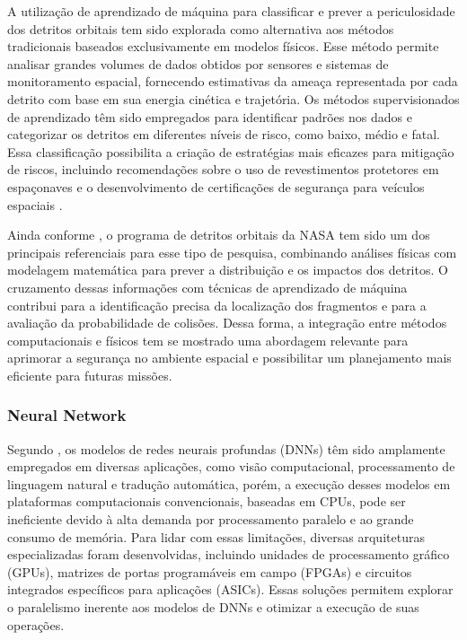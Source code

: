 A utilização de aprendizado de máquina para classificar e prever a periculosidade dos detritos orbitais tem sido explorada como alternativa aos métodos tradicionais baseados exclusivamente em modelos físicos. Esse método permite analisar grandes volumes de dados obtidos por sensores e sistemas de monitoramento espacial, fornecendo estimativas da ameaça representada por cada detrito com base em sua energia cinética e trajetória. Os métodos supervisionados de aprendizado têm sido empregados para identificar padrões nos dados e categorizar os detritos em diferentes níveis de risco, como baixo, médio e fatal. Essa classificação possibilita a criação de estratégias mais eficazes para mitigação de riscos, incluindo recomendações sobre o uso de revestimentos protetores em espaçonaves e o desenvolvimento de certificações de segurança para veículos espaciais \citep{sri2024}.

Ainda conforme \citep{sri2024}, o programa de detritos orbitais da NASA tem sido um dos principais referenciais para esse tipo de pesquisa, combinando análises físicas com modelagem matemática para prever a distribuição e os impactos dos detritos. O cruzamento dessas informações com técnicas de aprendizado de máquina contribui para a identificação precisa da localização dos fragmentos e para a avaliação da probabilidade de colisões. Dessa forma, a integração entre métodos computacionais e físicos tem se mostrado uma abordagem relevante para aprimorar a segurança no ambiente espacial e possibilitar um planejamento mais eficiente para futuras missões.

\subsubsection{Neural Network}

Segundo \citep{ke2018}, os modelos de redes neurais profundas (DNNs) têm sido amplamente empregados em diversas aplicações, como visão computacional, processamento de linguagem natural e tradução automática, porém, a execução desses modelos em plataformas computacionais convencionais, baseadas em CPUs, pode ser ineficiente devido à alta demanda por processamento paralelo e ao grande consumo de memória. Para lidar com essas limitações, diversas arquiteturas especializadas foram desenvolvidas, incluindo unidades de processamento gráfico (GPUs), matrizes de portas programáveis em campo (FPGAs) e circuitos integrados específicos para aplicações (ASICs). Essas soluções permitem explorar o paralelismo inerente aos modelos de DNNs e otimizar a execução de suas operações.

